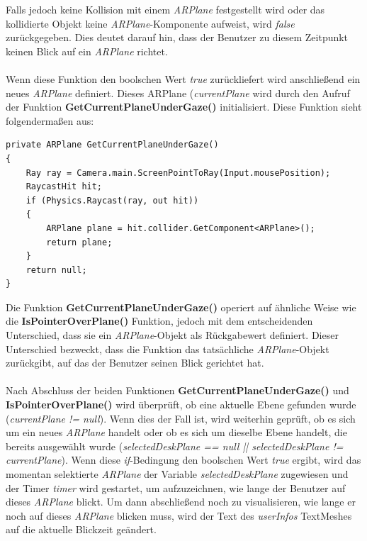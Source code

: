 Falls jedoch keine Kollision mit einem \textit{ARPlane} festgestellt wird oder das kollidierte Objekt keine
\textit{ARPlane}-Komponente aufweist, wird \textit{false} zurückgegeben. Dies deutet darauf hin, dass der Benutzer zu
diesem Zeitpunkt keinen Blick auf ein \textit{ARPlane} richtet.\\
\\
Wenn diese Funktion den boolschen Wert \textit{true} zurückliefert wird anschließend ein neues \textit{ARPlane} definiert.
Dieses ARPlane (\textit{currentPlane} wird durch den Aufruf der Funktion \textbf{GetCurrentPlaneUnderGaze()} initialisiert.
Diese Funktion sieht folgendermaßen aus:
\begin{lstlisting}[caption={Gewolltes ARPlane ermitteln}, label=code:isPOP]
private ARPlane GetCurrentPlaneUnderGaze()
{
    Ray ray = Camera.main.ScreenPointToRay(Input.mousePosition);
    RaycastHit hit;
    if (Physics.Raycast(ray, out hit))
    {
        ARPlane plane = hit.collider.GetComponent<ARPlane>();
        return plane;
    }
    return null;
}
\end{lstlisting}
Die Funktion \textbf{GetCurrentPlaneUnderGaze()} operiert auf ähnliche Weise wie die \textbf{IsPointerOverPlane()} Funktion,
jedoch mit dem entscheidenden Unterschied, dass sie ein \textit{ARPlane}-Objekt als Rückgabewert definiert. Dieser
Unterschied bezweckt, dass die Funktion das tatsächliche \textit{ARPlane}-Objekt zurückgibt, auf das der Benutzer seinen
Blick gerichtet hat.\\
\\
Nach Abschluss der beiden Funktionen \textbf{GetCurrentPlaneUnderGaze()} und \textbf{IsPointerOverPlane()} wird überprüft,
ob eine aktuelle Ebene gefunden wurde (\textit{currentPlane != null}). Wenn dies der Fall ist, wird weiterhin geprüft, ob
es sich um ein neues \textit{ARPlane} handelt oder ob es sich um dieselbe Ebene handelt, die bereits ausgewählt wurde
(\textit{selectedDeskPlane == null || selectedDeskPlane != currentPlane}). Wenn diese \textit{if}-Bedingung den boolschen
Wert \textit{true} ergibt, wird das momentan selektierte \textit{ARPlane} der Variable \textit{selectedDeskPlane} zugewiesen
und der Timer \textit{timer} wird gestartet, um aufzuzeichnen, wie lange der Benutzer auf dieses \textit{ARPlane} blickt.
Um dann abschließend noch zu visualisieren, wie lange er noch auf dieses \textit{ARPlane} blicken muss, wird der Text
des \textit{userInfos} TextMeshes auf die aktuelle Blickzeit geändert.

